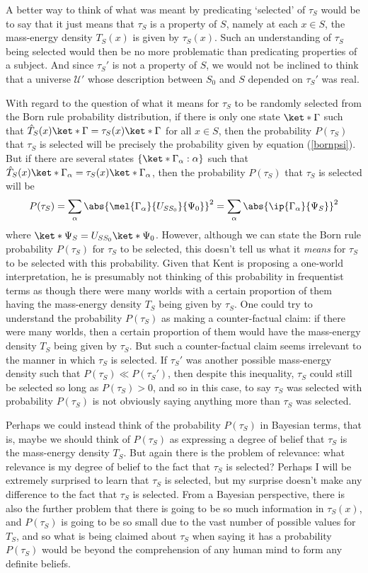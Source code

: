 \documentclass[12pt]{report}
\begin{document}
A better way to think of what was meant by predicating `selected' of $\tau_S$ would be to say that it just means that $\tau_S$ is a property of $S$, namely at each $x\in S$, the mass-energy density $T_S(x)$ is given by $\tau_S(x)$. Such an understanding of $\tau_S$ being selected would then be no more problematic than predicating properties of a subject. And since $\tau_S'$ is not a property of $S$, we would not be inclined to think that a universe $\mathcal{U}'$  whose description between $S_0$ and $S$ depended on $\tau_S'$ was real. 

With regard to the question of what it means for $\tau_S$ to be randomly selected from the Born rule probability distribution, if there is only one state $\ket*{\Gamma}$ such that $\hat{T}_S(x)\ket*{\Gamma}=\tau_S(x)\ket*{\Gamma}$ for all $x\in S$, then the probability $P(\tau_S)$ that $\tau_S$ is selected will be precisely the probability given by equation (\ref{bornpsi}). But if there are several states $\{\ket*{\Gamma_\alpha}:\alpha\}$ such that  $\hat{T}_S(x)\ket*{\Gamma_\alpha}=\tau_S(x)\ket*{\Gamma_\alpha}$, then the probability $P(\tau_S)$ that $\tau_S$ is selected will be 
$$P(\tau_S)=\sum_\alpha \abs{\mel{\Gamma_\alpha}{U_{SS_0}}{\Psi_0}}^2=\sum_\alpha \abs{\ip{\Gamma_\alpha}{\Psi_S}}^2$$ 
where $\ket*{\Psi_S}=U_{SS_0}\ket*{\Psi_0}$. However, although we can state the Born rule probability $P(\tau_S)$ for $\tau_S$ to be selected, this doesn't tell us what it \emph{means} for $\tau_S$ to be selected with this probability. Given that Kent is proposing a one-world interpretation, he is presumably not thinking of this probability in frequentist terms as though there were many worlds with a certain proportion of them having the mass-energy density $T_S$ being given by $\tau_S$. One could try to understand the probability $P(\tau_S)$ as making a counter-factual claim: if there were many worlds, then a certain proportion of them would have the mass-energy density $T_S$ being given by $\tau_S$. But such a counter-factual claim seems irrelevant to the manner in which $\tau_S$ is selected. If $\tau_S'$ was another possible mass-energy density such that $P(\tau_S)\ll P(\tau_S')$,  then despite this inequality, $\tau_S$ could still be selected so long as $P(\tau_S)>0$, and so in this case, to say $\tau_S$ was selected with probability $P(\tau_S)$ is not obviously saying anything more than  $\tau_S$ was selected.

Perhaps we could instead think of the probability $P(\tau_S)$ in Bayesian terms, that is, maybe we should think of $P(\tau_S)$ as expressing a degree of belief that $\tau_S$ is the mass-energy density $T_S$. But again there is the problem of relevance: what relevance is my degree of belief to the fact that $\tau_S$ is selected? Perhaps I will be extremely surprised to learn that $\tau_S$ is selected, but my surprise doesn't make any difference to the fact that $\tau_S$ is selected. From a Bayesian perspective, there is also the further problem that there is going to be so much information in $\tau_S(x)$, and $P(\tau_S)$ is going to be so small due to the vast number of possible values for $T_S$, and so what is being claimed about $\tau_S$ when saying it has a probability $P(\tau_S)$ would be beyond the comprehension of any human mind to form any definite beliefs. 
\end{document}
